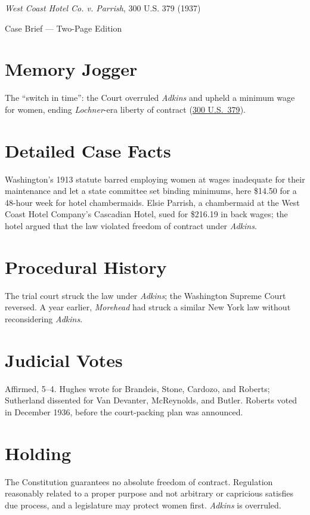 \documentclass[12pt]{article}
\begin{document}
\begin{center}
{\LARGE \textit{West Coast Hotel Co. v. Parrish}, 300 U.S. 379 (1937)\par}
\vspace{0.5em}
{\large Case Brief --- Two-Page Edition\par}
\end{center}

\section{Memory Jogger}
The ``switch in time'': the Court overruled \textit{Adkins} and upheld a minimum wage for women, ending \textit{Lochner}-era liberty of contract (\href{https://supreme.justia.com/cases/federal/us/300/379/}{300 U.S.\ 379}).

\section{Detailed Case Facts}
Washington's 1913 statute barred employing women at wages inadequate for their maintenance and let a state committee set binding minimums, here \$14.50 for a 48-hour week for hotel chambermaids. Elsie Parrish, a chambermaid at the West Coast Hotel Company's Cascadian Hotel, sued for \$216.19 in back wages; the hotel argued that the law violated freedom of contract under \textit{Adkins}.

\section{Procedural History}
The trial court struck the law under \textit{Adkins}; the Washington Supreme Court reversed. A year earlier, \textit{Morehead} had struck a similar New York law without reconsidering \textit{Adkins}.

\section{Judicial Votes}
Affirmed, 5--4. Hughes wrote for Brandeis, Stone, Cardozo, and Roberts; Sutherland dissented for Van Devanter, McReynolds, and Butler. Roberts voted in December 1936, before the court-packing plan was announced.

\section{Holding}
The Constitution guarantees no absolute freedom of contract. Regulation reasonably related to a proper purpose and not arbitrary or capricious satisfies due process, and a legislature may protect women first. \textit{Adkins} is overruled.
\end{document}
